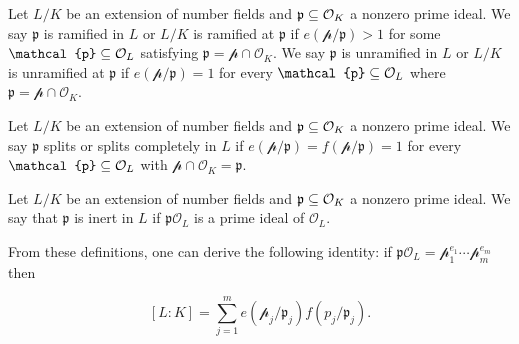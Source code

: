 \begin{definition}
    Let $L/K$ be an extension of number fields and $\mathfrak{p} \subseteq \mathcal{O}_{K}$ a nonzero prime ideal. We say $\mathfrak{p}$ is ramified in $L$ or $L/K$ is ramified at $\mathfrak{p}$ if $e(\mathcal{p}/\mathfrak{p}) > 1$ for some $\mathcal{p} \sq \mathcal{O}_{L}$ satisfying $\mathfrak{p} = \mathcal{p}\cap \mathcal{O}_{K}$. We say $\mathfrak{p}$ is unramified in $L$ or $L/K$ is unramified at $\mathfrak{p}$ if $e(\mathcal{p}/\mathfrak{p}) =1$ for every $\mathcal{p} \sq \mathcal{O}_{L}$ where $\mathfrak{p} = \mathcal{p}\cap \mathcal{O}_{K}$.
\end{definition}

\begin{definition}
    Let $L/K$ be an extension of number fields and $\mathfrak{p} \subseteq \mathcal{O}_{K}$ a nonzero prime ideal. We say $\mathfrak{p}$ splits or splits completely in $L$ if $e(\mathcal{p}/\mathfrak{p}) = f(\mathcal{p}/\mathfrak{p}) = 1$ for every $\mathcal{p} \sq \mathcal{O}_{L}$ with $\mathcal{p} \cap \mathcal{O}_{K} = \mathfrak{p}$.
\end{definition}

\begin{definition}
    Let $L/K$ be an extension of number fields and $\mathfrak{p} \subseteq \mathcal{O}_{K}$ a nonzero prime ideal. We say that $\mathfrak{p}$ is inert in $L$ if $\mathfrak{p}\mathcal{O}_{L}$ is a prime ideal of $\mathcal{O}_{L}$.
\end{definition}

From these definitions, one can derive the following identity: if $\mathfrak{p} \mathcal{O}_{L} = \mathcal{p}_1^{e_1}\cdots \mathcal{p}_m^{e_m}$ then 

    \[[L:K] = \sum_{j=1}^m e(\mathcal{p}_j/\mathfrak{p}_j)f(\mathit{p}_j/\mathfrak{p}_j).\]

